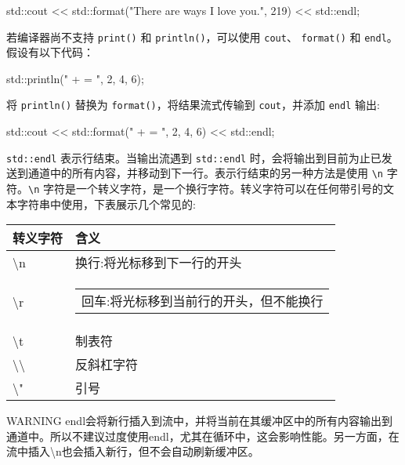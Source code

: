 \begin{cpp}
std::cout << std::format("There are {} ways I love you.", 219) << std::endl;
\end{cpp}

若编译器尚不支持 \verb|print()| 和 \verb|println()|，可以使用 \verb|cout|、 \verb|format()| 和 \verb|endl|。假设有以下代码：

\begin{cpp}
std::println("{} + {} = {}", 2, 4, 6);
\end{cpp}

将 \verb|println()| 替换为 \verb|format()|，将结果流式传输到 \verb|cout|，并添加 \verb|endl| 输出:

\begin{cpp}
std::cout << std::format("{} + {} = {}", 2, 4, 6) << std::endl;
\end{cpp}

\verb|std::endl| 表示行结束。当输出流遇到 \verb|std::endl| 时，会将输出到目前为止已发送到通道中的所有内容，并移动到下一行。表示行结束的另一种方法是使用 \verb|\n| 字符。\verb|\n| 字符是一个转义字符，是一个换行字符。转义字符可以在任何带引号的文本字符串中使用，下表展示几个常见的:

\begin{longtable}{|l|l|}
\hline
\textbf{转义字符}         & \textbf{含义}                                             \\ \hline
\endfirsthead
%
\endhead
%
\textbackslash{}n                & 换行:将光标移到下一行的开头 \\ \hline
\textbackslash{}r &
\begin{tabular}[c]{@{}l@{}}回车:将光标移到当前行的开头，但不能换行\end{tabular} \\ \hline
\textbackslash{}t                & 制表符                                                          \\ \hline
\textbackslash{}\textbackslash{} & 反斜杠字符                                          \\ \hline
\textbackslash{}"                & 引号                                               \\ \hline
\end{longtable}

\begin{myWarning}{WARNING}
endl会将新行插入到流中，并将当前在其缓冲区中的所有内容输出到通道中。所以不建议过度使用endl，尤其在循环中，这会影响性能。另一方面，在流中插入\textbackslash{}n也会插入新行，但不会自动刷新缓冲区。
\end{myWarning}

